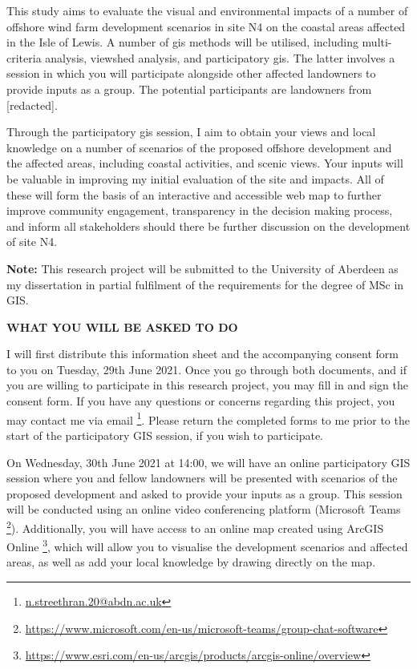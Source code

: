 {This study aims to evaluate the visual and environmental impacts of a number of
offshore wind farm development scenarios in site N4 on the coastal areas
affected in the Isle of Lewis. A number of \gls{gis} methods will be utilised,
including multi-criteria analysis, viewshed analysis, and participatory
\gls{gis}. The latter involves a session in which you will participate
alongside other affected landowners to provide inputs as a group. The potential
participants are landowners from [redacted].

Through the participatory \gls{gis} session, I aim to obtain your views and
local knowledge on a number of scenarios of the proposed offshore development
and the affected areas, including coastal activities, and scenic views. Your
inputs will be valuable in improving my initial evaluation of the site and
impacts. All of these will form the basis of an interactive and accessible web
map to further improve community engagement, transparency in the decision
making process, and inform all stakeholders should there be further discussion
on the development of site N4.

\textbf{Note:} This research project will be submitted to the University of
Aberdeen as my dissertation in partial fulfilment of the requirements for the
degree of MSc in GIS.

\vspace{20pt}
\textbf{\MakeUppercase{What you will be asked to do}}

I will first distribute this information sheet and the accompanying consent
form to you on Tuesday, 29th June 2021. Once you go through both documents, and
if you are willing to participate in this research project, you may fill in and
sign the consent form. If you have any questions or concerns regarding this
project, you may contact me via email%
\footnote{\href{mailto:n.streethran.20@abdn.ac.uk}%
{n.streethran.20@abdn.ac.uk}\label{fn:email}}. Please return the completed
forms to me prior to the start of the participatory GIS session, if you wish to
participate.

On Wednesday, 30th June 2021 at 14:00, we will have an online participatory GIS
session where you and fellow landowners will be presented with scenarios of the
proposed development and asked to provide your inputs as a group. This session
will be conducted using an online video conferencing platform (Microsoft Teams%
\footnote{\url{https://www.microsoft.com/en-us/microsoft-teams/group-chat-software}}).
Additionally, you will have access to an online map created using ArcGIS Online%
\footnote{\url{https://www.esri.com/en-us/arcgis/products/arcgis-online/overview}},
which will allow you to visualise the development scenarios and
affected areas, as well as add your local knowledge by drawing directly on the
map.

}
